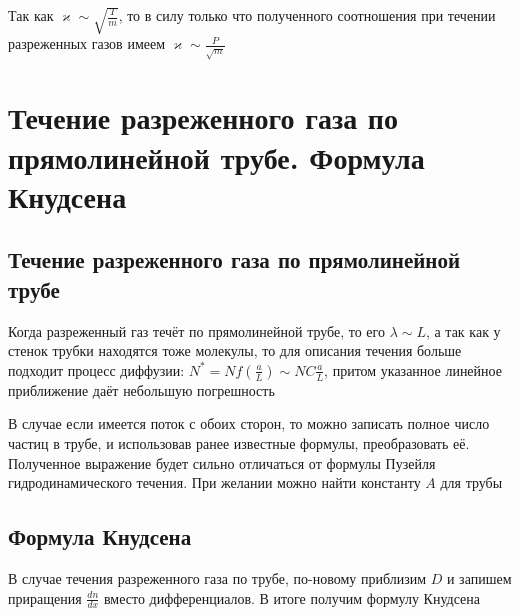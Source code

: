 \documentclass[a4paper, 14pt]{article}
\begin{document}
    Так как $\varkappa \sim \sqrt{\frac{T}{m}}$, то в силу только что полученного соотношения при течении
    разреженных газов имеем $\varkappa \sim \frac{P}{\sqrt{m}}$
    
    \section{Течение разреженного газа по прямолинейной трубе.
    Формула Кнудсена}
    
    \subsection{Течение разреженного газа по прямолинейной трубе}
    
    Когда разреженный газ течёт по прямолинейной трубе, то его $\lambda \sim L$, а так как у стенок трубки находятся
    тоже молекулы, то для описания течения больше подходит процесс диффузии: $N^* = N f\left(\frac{a}{L}\right) \sim
    NC\frac{a}{L}$, притом указанное линейное приближение даёт небольшую погрешность
    
    В случае если имеется поток с обоих сторон, то можно записать полное число частиц в трубе, и использовав ранее
    известные формулы, преобразовать её.
    Полученное выражение будет сильно отличаться от формулы Пузейля гидродинамического течения.
    При желании можно найти константу $A$ для трубы
    
    \subsection{Формула Кнудсена}
    
    В случае течения разреженного газа по трубе, по-новому приблизим $D$ и запишем приращения $\frac{dn}{dx}$ вместо
    дифференциалов.
    В итоге получим формулу Кнудсена
\end{document}
